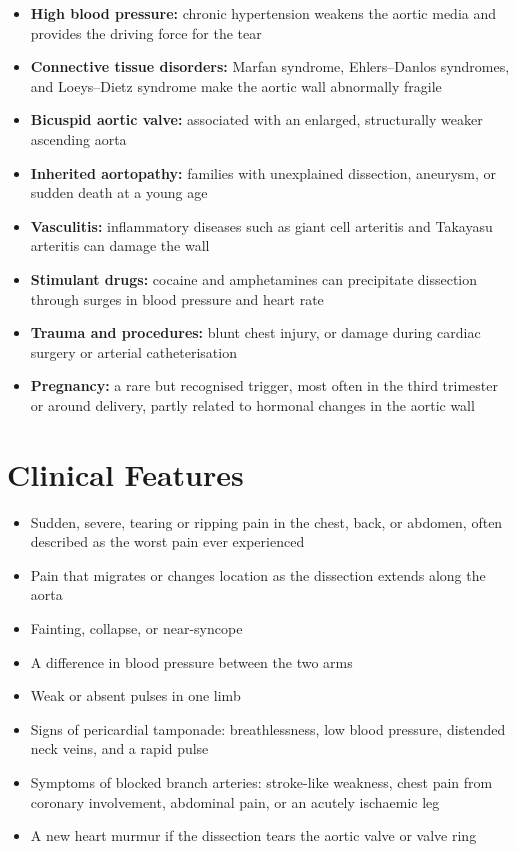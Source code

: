 \begin{itemize}
    \item \textbf{High blood pressure:} chronic hypertension weakens the aortic media and provides the driving force for the tear
    \item \textbf{Connective tissue disorders:} Marfan syndrome, Ehlers--Danlos syndromes, and Loeys--Dietz syndrome make the aortic wall abnormally fragile
    \item \textbf{Bicuspid aortic valve:} associated with an enlarged, structurally weaker ascending aorta
    \item \textbf{Inherited aortopathy:} families with unexplained dissection, aneurysm, or sudden death at a young age
    \item \textbf{Vasculitis:} inflammatory diseases such as giant cell arteritis and Takayasu arteritis can damage the wall
    \item \textbf{Stimulant drugs:} cocaine and amphetamines can precipitate dissection through surges in blood pressure and heart rate
    \item \textbf{Trauma and procedures:} blunt chest injury, or damage during cardiac surgery or arterial catheterisation
    \item \textbf{Pregnancy:} a rare but recognised trigger, most often in the third trimester or around delivery, partly related to hormonal changes in the aortic wall
\end{itemize}

\section*{Clinical Features}
\begin{itemize}
    \item Sudden, severe, tearing or ripping pain in the chest, back, or abdomen, often described as the worst pain ever experienced
    \item Pain that migrates or changes location as the dissection extends along the aorta
    \item Fainting, collapse, or near-syncope
    \item A difference in blood pressure between the two arms
    \item Weak or absent pulses in one limb
    \item Signs of pericardial tamponade: breathlessness, low blood pressure, distended neck veins, and a rapid pulse
    \item Symptoms of blocked branch arteries: stroke-like weakness, chest pain from coronary involvement, abdominal pain, or an acutely ischaemic leg
    \item A new heart murmur if the dissection tears the aortic valve or valve ring
\end{itemize}

